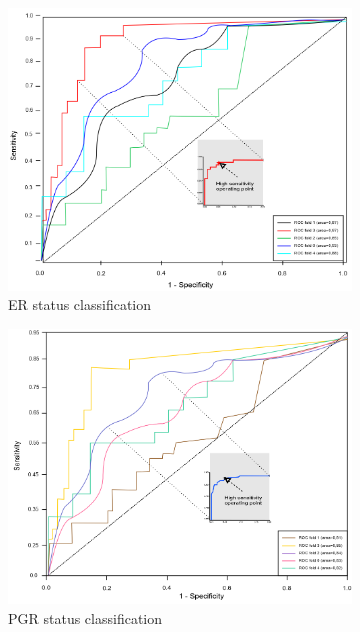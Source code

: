 \iffalse
\begin{figure}
	\centering
	\begin{subfigure}{.49\linewidth}
		\centering
		\includegraphics[width=0.9\linewidth]{images/roc_er.png}
		\caption{ER status classification}
        \label{fig:er_roc}
	\end{subfigure}
	\begin{subfigure}{.49\linewidth}
		\centering
		\includegraphics[width=0.9\linewidth]{images/roc_pgr.png}
		\caption{PGR status classification}
        \label{fig:pgr_roc}
	\end{subfigure}\\[1ex]
	\begin{subfigure}{0.49\linewidth}
		\centering

\end{subfigure}
\end{figure}
